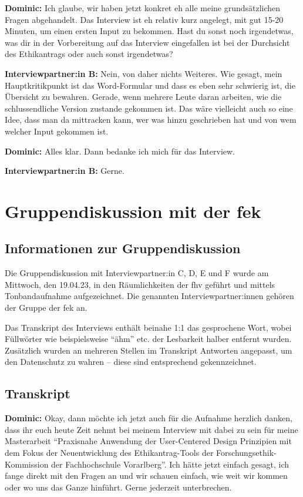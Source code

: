 \documentclass[a4paper,12pt,twoside,numbers=noendperiod]{scrreprt}
\begin{document}
\textbf{Dominic:} Ich glaube, wir haben jetzt konkret eh alle meine grundsätzlichen Fragen abgehandelt. Das Interview ist eh relativ kurz angelegt, mit gut 15-20 Minuten, um einen ersten Input zu bekommen. Hast du sonst noch irgendetwas, was dir in der Vorbereitung auf das Interview eingefallen ist bei der Durchsicht des Ethikantrags oder auch sonst irgendetwas?

\textbf{Interviewpartner:in B:} Nein, von daher nichts Weiteres. Wie gesagt, mein Hauptkritikpunkt ist das Word-Formular und dass es eben sehr schwierig ist, die Übersicht zu bewahren. Gerade, wenn mehrere Leute daran arbeiten, wie die schlussendliche Version zustande gekommen ist. Das wäre vielleicht auch so eine Idee, dass man da mittracken kann, wer was hinzu geschrieben hat und von wem welcher Input gekommen ist.

\textbf{Dominic:} Alles klar. Dann bedanke ich mich für das Interview.

\textbf{Interviewpartner:in B:} Gerne.

\cleardoublepage
\chapter{Gruppendiskussion mit der \acl{fek}}
\label{appendix:gruppendiskussion}

\section{Informationen zur Gruppendiskussion}
\label{appendix:gruppendiskussion-infos}

Die Gruppendiskussion mit Interviewpartner:in C, D, E und F wurde am Mittwoch, den 19.04.23, in den Räumlichkeiten der \ac{fhv} geführt und mittels Tonbandaufnahme aufgezeichnet. Die genannten Interviewpartner:innen gehören der Gruppe der \acl{fek} an.

Das Transkript des Interviews enthält beinahe 1:1 das gesprochene Wort, wobei Füllwörter wie beispielsweise \enquote{ähm} etc. der Lesbarkeit halber entfernt wurden. Zusätzlich wurden an mehreren Stellen im Transkript Antworten angepasst, um den Datenschutz zu wahren -- diese sind entsprechend gekennzeichnet.

\section{Transkript}
\label{appendix:gruppendiskussion-transkript}

\textbf{Dominic:} Okay, dann möchte ich jetzt auch für die Aufnahme herzlich danken, dass ihr euch heute Zeit nehmt bei meinem Interview mit dabei zu sein für meine Masterarbeit \enquote{Praxisnahe Anwendung der User-Centered Design Prinzipien mit dem Fokus der Neuentwicklung des Ethikantrag-Tools der Forschungsethik-Kommission der Fachhochschule Vorarlberg}. Ich hätte jetzt einfach gesagt, ich fange direkt mit den Fragen an und wir schauen einfach, wie weit wir kommen oder wo uns das Ganze hinführt. Gerne jederzeit unterbrechen.
\end{document}
